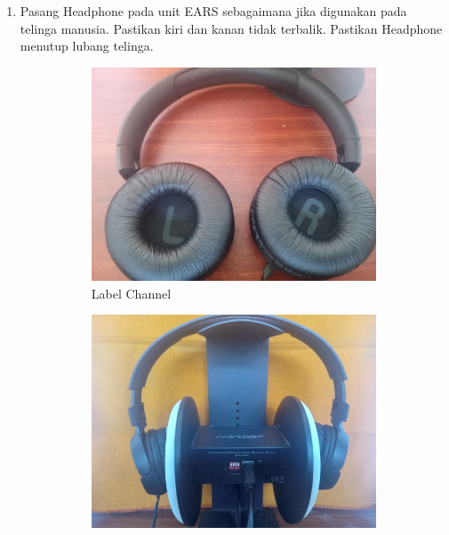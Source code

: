 \documentclass[12pt]{book}
\begin{document}
	\begin{enumerate}
		\item Pasang Headphone pada unit EARS sebagaimana jika digunakan pada telinga manusia.
		Pastikan kiri dan kanan tidak terbalik.
		Pastikan Headphone menutup lubang telinga.

		\newpage
		\begin{figure}[!ht]
			\centering
			\begin{subfigure}[t]{0.35\textwidth}
				\includegraphics[width=\textwidth]{images/pasang/chjbl}
				\caption{Label Channel}
			\end{subfigure}
			\begin{subfigure}[t]{0.35\textwidth}
				\includegraphics[width=\textwidth]{images/pasang/pasangjbl}

\end{subfigure}
\end{figure}
\end{enumerate}
\end{document}
